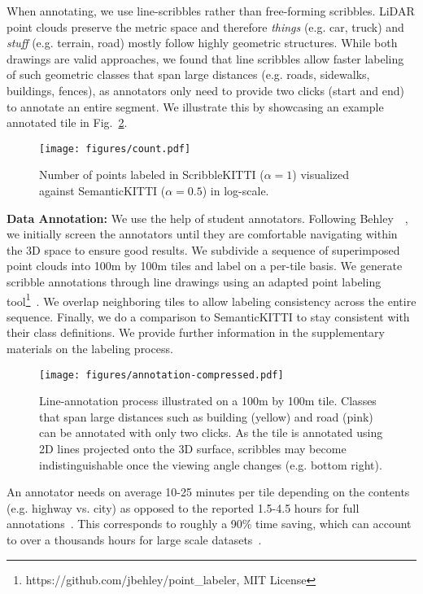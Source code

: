 \documentclass[10pt,twocolumn,letterpaper]{article}
\begin{document}
When annotating, we use line-scribbles rather than free-forming scribbles. LiDAR point clouds preserve the metric space and therefore \textit{things} (e.g. car, truck) and \textit{stuff} (e.g. terrain, road) mostly follow highly geometric structures. While both drawings are valid approaches, we found that line scribbles allow faster labeling of such geometric classes that span large distances (e.g. roads, sidewalks, buildings, fences), as annotators only need to provide two clicks (start and end) to annotate an entire segment. We illustrate this by showcasing an example annotated tile in Fig.~\ref{fig:annotation_process}.

\begin{figure}[t]
    \centering
    \texttt{[image: figures/count.pdf]}
    \caption{Number of points labeled in ScribbleKITTI ($\alpha=1$) visualized against SemanticKITTI ($\alpha=0.5$) in log-scale.}
    \label{fig:count}
\end{figure}

\noindent \textbf{Data Annotation:} We use the help of student annotators. Following Behley~\etal~\cite{iccv2019semantickitti}, we initially screen the annotators until they are comfortable navigating within the 3D space to ensure good results. We subdivide a sequence of superimposed point clouds into 100m by 100m tiles and label on a per-tile basis. We generate scribble annotations through line drawings using an adapted point labeling tool\footnote{https://github.com/jbehley/point\_labeler, MIT License}~\cite{iccv2019semantickitti}. We overlap neighboring tiles to allow labeling consistency across the entire sequence. Finally, we do a comparison to SemanticKITTI to stay consistent with their class definitions.
We provide further information in the supplementary materials on the labeling process.


\begin{figure}
    \centering
    \texttt{[image: figures/annotation-compressed.pdf]}
    \caption{Line-annotation process illustrated on a 100m by 100m tile. Classes that span large distances such as building (yellow) and road (pink) can be annotated with only two clicks. As the tile is annotated using 2D lines projected onto the 3D surface, scribbles may become indistinguishable once the viewing angle changes (e.g. bottom right).}
    \label{fig:annotation_process}
\end{figure}

An annotator needs on average 10-25 minutes per tile depending on the contents (e.g. highway vs. city) as opposed to the reported 1.5-4.5 hours for full annotations~\cite{iccv2019semantickitti}. This corresponds to roughly a 90\% time saving, which can account to over a thousands hours for large scale datasets~\cite{iccv2019semantickitti}.
\end{document}
